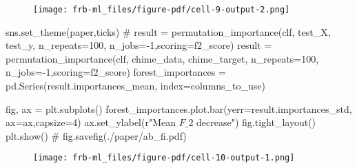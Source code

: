 \documentclass[
  letterpaper,
  DIV=11,
  numbers=noendperiod]{scrartcl}
\newenvironment{Shaded}{\begin{snugshade}}{\end{snugshade}}
\newcommand{\CommentTok}[1]{\textcolor[rgb]{0.37,0.37,0.37}{#1}}
\newcommand{\DecValTok}[1]{\textcolor[rgb]{0.68,0.00,0.00}{#1}}
\newcommand{\NormalTok}[1]{\textcolor[rgb]{0.00,0.23,0.31}{#1}}
\newcommand{\OperatorTok}[1]{\textcolor[rgb]{0.37,0.37,0.37}{#1}}
\newcommand{\StringTok}[1]{\textcolor[rgb]{0.13,0.47,0.30}{#1}}
\newcommand{\VerbatimStringTok}[1]{\textcolor[rgb]{0.13,0.47,0.30}{#1}}
\begin{document}
\begin{figure}[H]

{\centering \texttt{[image: frb-ml\_files/figure-pdf/cell-9-output-2.png]}

}

\end{figure}

\begin{Shaded}
\begin{Highlighting}[]
\NormalTok{sns.set\_theme(}\StringTok{\textquotesingle{}paper\textquotesingle{}}\NormalTok{,}\StringTok{\textquotesingle{}ticks\textquotesingle{}}\NormalTok{)}
\CommentTok{\# result = permutation\_importance(clf, test\_X, test\_y, n\_repeats=100, n\_jobs={-}1,scoring=f2\_score)}
\NormalTok{result }\OperatorTok{=}\NormalTok{ permutation\_importance(clf, chime\_data, chime\_target, n\_repeats}\OperatorTok{=}\DecValTok{100}\NormalTok{, n\_jobs}\OperatorTok{={-}}\DecValTok{1}\NormalTok{,scoring}\OperatorTok{=}\NormalTok{f2\_score)}
\NormalTok{forest\_importances }\OperatorTok{=}\NormalTok{ pd.Series(result.importances\_mean, index}\OperatorTok{=}\NormalTok{columns\_to\_use)}

\NormalTok{fig, ax }\OperatorTok{=}\NormalTok{ plt.subplots()}
\NormalTok{forest\_importances.plot.bar(yerr}\OperatorTok{=}\NormalTok{result.importances\_std, ax}\OperatorTok{=}\NormalTok{ax,capsize}\OperatorTok{=}\DecValTok{4}\NormalTok{)}
\NormalTok{ax.set\_ylabel(}\VerbatimStringTok{r"Mean $F\_2$ decrease"}\NormalTok{)}
\NormalTok{fig.tight\_layout()}
\NormalTok{plt.show()}
\CommentTok{\# fig.savefig(\textquotesingle{}./paper/ab\_fi.pdf\textquotesingle{})}
\end{Highlighting}
\end{Shaded}

\begin{figure}[H]

{\centering \texttt{[image: frb-ml\_files/figure-pdf/cell-10-output-1.png]}

}

\end{figure}
\end{document}
